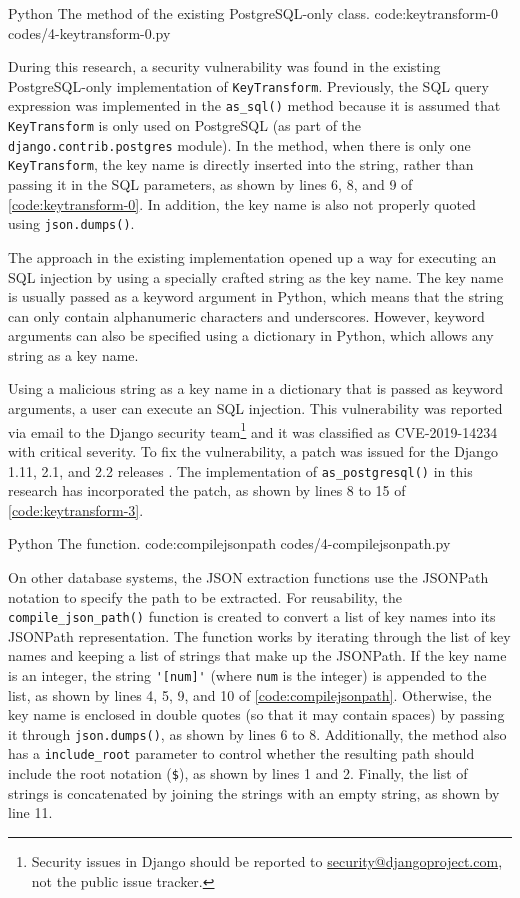 \listing
{Python}
{The  method of the existing PostgreSQL-only  class.}
{code:keytransform-0}
{codes/4-keytransform-0.py}

During this research, a security vulnerability was found in the existing
PostgreSQL-only implementation of \verb|KeyTransform|. Previously, the SQL
query expression was implemented in the \verb|as_sql()| method because it is
assumed that \verb|KeyTransform| is only used on PostgreSQL (as part of the
\verb|django.contrib.postgres| module). In the method, when there is only one
\verb|KeyTransform|, the key name is directly inserted into the string, rather
than passing it in the SQL parameters, as shown by lines 6, 8, and 9 of
\autoref{code:keytransform-0}. In addition, the key name is also not properly
quoted using \verb|json.dumps()|.

The approach in the existing implementation opened up a way for executing an
SQL injection by using a specially crafted string as the key name. The key name
is usually passed as a keyword argument in Python, which means that the string
can only contain alphanumeric characters and underscores. However, keyword
arguments can also be specified using a dictionary in Python, which allows any
string as a key name.

Using a malicious string as a key name in a dictionary that is passed as keyword
arguments, a user can execute an SQL injection. This vulnerability was reported
via email to the Django security team\footnote{Security issues in Django should
be reported to
\href{mailto:security@djangoproject.com}{security@djangoproject.com}, not the
public issue tracker.} and it was classified as CVE-2019-14234 \cite{cve} with
critical severity. To fix the vulnerability, a patch was issued for the Django
1.11, 2.1, and 2.2 releases \cite{django:securityrelease}. The implementation
of \verb|as_postgresql()| in this research has incorporated the patch, as shown
by lines 8 to 15 of \autoref{code:keytransform-3}.

\listing
{Python}
{The  function.}
{code:compilejsonpath}
{codes/4-compilejsonpath.py}

On other database systems, the JSON extraction functions use the JSONPath
notation to specify the path to be extracted. For reusability, the
\verb|compile_json_path()| function is created to convert a list of key names
into its JSONPath representation. The function works by iterating through the
list of key names and keeping a list of strings that make up the JSONPath. If
the key name is an integer, the string \verb|'[num]'| (where \verb|num| is the
integer) is appended to the list, as shown by lines 4, 5, 9, and 10 of
\autoref{code:compilejsonpath}. Otherwise, the key name is enclosed in double
quotes (so that it may contain spaces) by passing it through
\verb|json.dumps()|, as shown by lines 6 to 8. Additionally, the method also
has a \verb|include_root| parameter to control whether the resulting path
should include the root notation (\verb|$|), as shown by lines 1 and 2.
Finally, the list of strings is concatenated by joining the strings with an
empty string, as shown by line 11.

